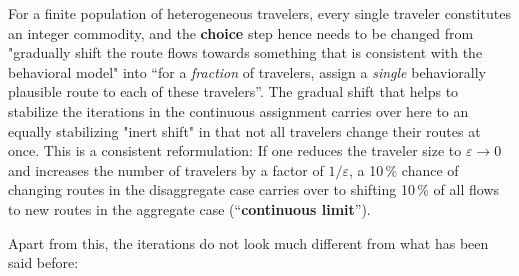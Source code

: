
%

For a finite population of heterogeneous travelers, every single
traveler constitutes an integer commodity, and the \textbf{choice}
step hence needs to be changed from "gradually shift the route flows
towards something that is consistent with the behavioral model" into
``for a \emph{fraction} of travelers, assign a \emph{single}
behaviorally plausible route to each of these travelers''. The gradual shift that
helps to stabilize the iterations in the continuous assignment carries
over here to an equally stabilizing "inert shift" in that not all travelers
change their routes at once. This is a consistent reformulation: If
one reduces the traveler size to $\varepsilon \rightarrow 0$ and
increases the number of travelers by a factor of $1/\varepsilon$,
a 10\,\% chance of
changing routes in the disaggregate case carries over to shifting 10\,\%
of all flows to new routes in the aggregate case (``\textbf{continuous
limit}'').

Apart from this, the iterations do not look much different from what
has been said before:

